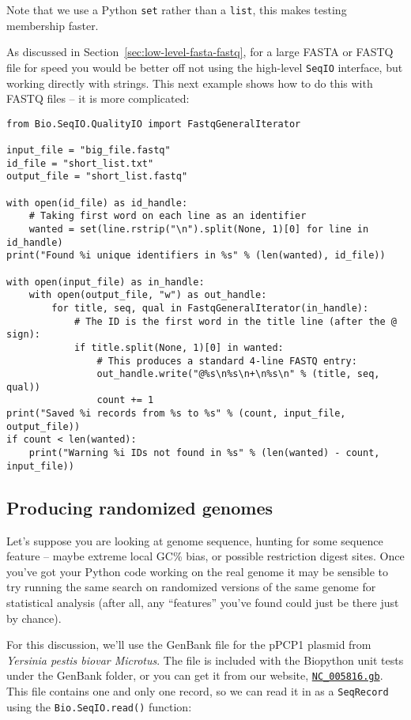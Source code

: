 Note that we use a Python \verb|set| rather than a \verb|list|, this makes
testing membership faster.

As discussed in Section~\ref{sec:low-level-fasta-fastq}, for a large FASTA
or FASTQ file for speed you would be better off not using the high-level
\verb|SeqIO| interface, but working directly with strings. This next
example shows how to do this with FASTQ files -- it is more complicated:

\begin{verbatim}
from Bio.SeqIO.QualityIO import FastqGeneralIterator

input_file = "big_file.fastq"
id_file = "short_list.txt"
output_file = "short_list.fastq"

with open(id_file) as id_handle:
    # Taking first word on each line as an identifier
    wanted = set(line.rstrip("\n").split(None, 1)[0] for line in id_handle)
print("Found %i unique identifiers in %s" % (len(wanted), id_file))

with open(input_file) as in_handle:
    with open(output_file, "w") as out_handle:
        for title, seq, qual in FastqGeneralIterator(in_handle):
            # The ID is the first word in the title line (after the @ sign):
            if title.split(None, 1)[0] in wanted:
                # This produces a standard 4-line FASTQ entry:
                out_handle.write("@%s\n%s\n+\n%s\n" % (title, seq, qual))
                count += 1
print("Saved %i records from %s to %s" % (count, input_file, output_file))
if count < len(wanted):
    print("Warning %i IDs not found in %s" % (len(wanted) - count, input_file))
\end{verbatim}

\subsection{Producing randomized genomes}

Let's suppose you are looking at genome sequence, hunting for some sequence
feature -- maybe extreme local GC\% bias, or possible restriction digest sites.
Once you've got your Python code working on the real genome it may be sensible
to try running the same search on randomized versions of the same genome for
statistical analysis (after all, any ``features'' you've found could just be
there just by chance).

For this discussion, we'll use the GenBank file for the pPCP1 plasmid from
\textit{Yersinia pestis biovar Microtus}.  The file is included with the
Biopython unit tests under the GenBank folder, or you can get it from our
website, \href{https://raw.githubusercontent.com/biopython/biopython/master/Tests/GenBank/NC_005816.gb}
{\texttt{NC\_005816.gb}}.
This file contains one and only one record, so we can read it in as a
\verb|SeqRecord| using the \verb|Bio.SeqIO.read()| function:

